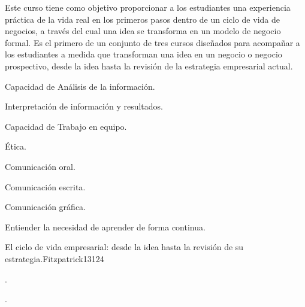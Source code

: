 \begin{syllabus}


\begin{justification}
Este curso tiene como objetivo proporcionar a los estudiantes una experiencia práctica de la vida  real en los  primeros pasos dentro de un ciclo de vida de negocios, a través del cual una idea se transforma en un modelo de negocio formal.
Es el primero de un conjunto de tres cursos diseñados para acompañar a los estudiantes a medida que transforman una idea en un negocio o negocio prospectivo, desde la idea  hasta la revisión de la estrategia empresarial actual.
\end{justification}

\begin{goals}
  \item Capacidad de Análisis de la información.
  \item Interpretación de información y resultados.
  \item Capacidad de Trabajo en equipo.
  \item Ética.
  \item Comunicación oral.
  \item Comunicación escrita.
  \item Comunicación gráfica.
  \item Entiender la necesidad de aprender de forma continua.
\end{goals}

\begin{outcomes}
\end{outcomes}

\begin{competences}
    \item {}
    \item {}
    \item {}
    \item {}
\end{competences}

\begin{unit}{}{El ciclo de vida empresarial: desde la idea hasta la revisión de su estrategia.}{Fitzpatrick13}{12}{4}
   \begin{topics}
      \item .
   \end{topics}
   \begin{learningoutcomes}
      \item .
   \end{learningoutcomes}
\end{unit}


\end{syllabus}
